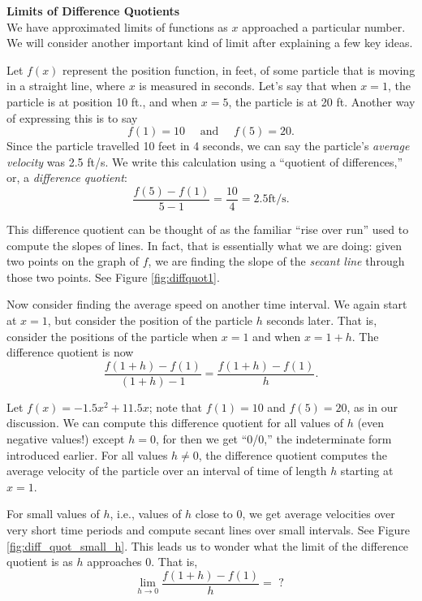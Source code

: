 \noindent\textbf{\large Limits of Difference Quotients}\\

We have approximated limits of functions as $x$ approached a particular number. We will consider another important kind of limit after explaining a few key ideas.


Let $f(x)$ represent the position function, in feet, of some particle that is moving in a straight line, where $x$ is measured in seconds. Let's say that when $x=1$, the particle is at position 10 ft., and when $x=5$, the particle is at 20 ft. Another way of expressing this is to say 
\[
f(1)=10 \quad \text{ and } \quad f(5) = 20.
\]
Since the particle travelled 10 feet in 4 seconds, we can say the particle's \textit{average velocity} was 2.5 ft/s. We write this calculation using a ``quotient of differences,'' or, a \textit{difference quotient}: 
\[
\frac{f(5) - f(1)}{5-1} = \frac{10}4 = 2.5 \text{ft/s}.
\]

This difference quotient can be thought of as the familiar ``rise over run'' used to compute the slopes of lines. In fact, that is essentially what we are doing: given two points on the graph of $f$, we are finding the slope of the \textit{secant line} through those two points. See Figure \ref{fig:diffquot1}.

Now consider finding the average speed on another time interval. We again start at $x=1$, but consider the position of the particle $h$ seconds later. That is, consider the positions of the particle when $x=1$ and when $x=1+h$. The difference quotient is now 
\[
\frac{f(1+h)-f(1)}{(1+h)-1} = \frac{f(1+h)-f(1)}h.
\]

Let $f(x) = -1.5x^2+11.5x$; note that $f(1)=10$ and $f(5) = 20$, as in our discussion. We can compute this difference quotient for all values of $h$ (even negative values!) except $h=0$, for then we get ``0/0,'' the indeterminate form introduced earlier. For all values $h\neq 0$, the difference quotient computes the average velocity of the particle over an interval of time of length $h$ starting at $x=1$. 

For small values of $h$, i.e., values of $h$ close to 0, we get average velocities over very short time periods and compute secant lines over small intervals. See Figure \ref{fig:diff_quot_small_h}. This leads us to wonder what the limit of the difference quotient is as $h$ approaches 0. That is, 
\[
\lim_{h\to 0} \frac{f(1+h)-f(1)}{h} = \text{ ? }
\]

